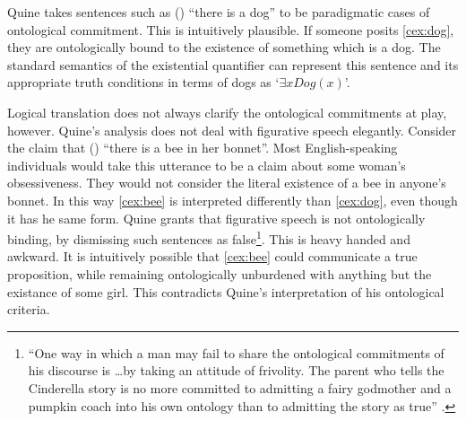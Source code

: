 Quine takes sentences such as (\cex) ``there is a dog''\label{cex:dog} to be
paradigmatic cases of ontological commitment.  This is intuitively
plausible.  If someone posits 
\eqref{cex:dog}, 
they are ontologically bound to the existence of something which is a dog.
The standard semantics of the
existential quantifier can represent this sentence and its appropriate
truth conditions in terms of dogs as `$\exists xDog(x)$'. 

Logical translation does not
always clarify the ontological commitments at play, however.
Quine's analysis does not deal with figurative speech elegantly.
Consider the claim that (\cex) ``there is a bee in her
bonnet''\label{cex:bee}. 
Most English-speaking individuals
would take this utterance to be a 
claim about some woman's obsessiveness.
They would not consider the literal
existence of a bee in
anyone's bonnet.  In this way \eqref{cex:bee} is interpreted differently than \eqref{cex:dog},
even though it has he same form.  
Quine %
grants that figurative speech is not ontologically binding, 
by dismissing such sentences as false\footnote{
  ``One way in which a man may fail to share the ontological
  commitments of his discourse is \ldots by taking an attitude of
  frivolity.  The parent who tells the Cinderella story is no more
  committed to admitting a fairy godmother and a pumpkin coach into
  his own ontology than to admitting the story as true''
  \cite[p.103]{quine}.}. This is heavy handed and awkward.  
It is intuitively possible that \eqref{cex:bee} could communicate a
true proposition, while remaining ontologically unburdened with
anything but the existance of some girl.  This contradicts Quine's interpretation of his
ontological criteria. 

